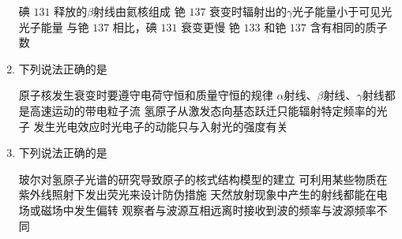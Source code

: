 \begin{enumerate}
\fourchoices
{碘 $ 131 $ 释放的$ \beta $射线由氦核组成}
{铯 $ 137 $ 衰变时辐射出的$ \gamma $光子能量小于可见光光子能量}
{与铯 $ 137 $ 相比，碘 $ 131 $ 衰变更慢}
{铯 $ 133 $ 和铯 $ 137 $ 含有相同的质子数}


\item
{}
下列说法正确的是  

\fourchoices
{原子核发生衰变时要遵守电荷守恒和质量守恒的规律}
{$ \alpha $射线、$ \beta $射线、$ \gamma $射线都是高速运动的带电粒子流}
{氢原子从激发态向基态跃迁只能辐射特定频率的光子}
{发生光电效应时光电子的动能只与入射光的强度有关}


\item 
{}
下列说法正确的是  

\fourchoices
{玻尔对氢原子光谱的研究导致原子的核式结构模型的建立}
{可利用某些物质在紫外线照射下发出荧光来设计防伪措施}
{天然放射现象中产生的射线都能在电场或磁场中发生偏转}
{观察者与波源互相远离时接收到波的频率与波源频率不同}





	
	
	
\end{enumerate}

